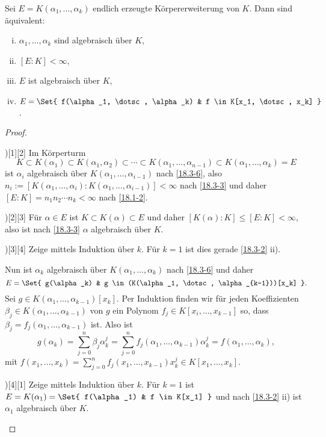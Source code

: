 \begin{kor} \label{18.3-10}
	Sei $E = K(\alpha_1, \dotsc, \alpha_k)$ endlich erzeugte Körpererweiterung von $K$.
	Dann sind äquivalent:
	\begin{enumerate}[i)]
		\item
			$\alpha_1, \dotsc, \alpha_k$ sind algebraisch über $K$,
		\item
			$[E : K] < \infty$,
		\item
			$E$ ist algebraisch über $K$,
		\item
			$E = \Set{ f(\alpha_1, \dotsc, \alpha_k) & f \in K[x_1, \dotsc, x_k] }$.
	\end{enumerate}
	\begin{proof}
		\begin{seg}{\ProofImplication)[1][2]}
			Im Körperturm
			\[
				K \subset K(\alpha_1)
				\subset K(\alpha_1, \alpha_2)
				\subset \dotsb
				\subset K(\alpha_1, \dotsc, \alpha_{n-1})
				\subset K(\alpha_1, \dotsc, \alpha_k)
				= E
			\]
			ist $\alpha_i$ algebraisch über $K(\alpha_1, \dotsc, \alpha_{i-1})$ nach \ref{18.3-6}, also $n_i := [K(\alpha_1, \dotsc, \alpha_i) : K(\alpha_1, \dotsc, \alpha_{i-1})] < \infty$ nach \ref{18.3-3} und daher $[E : K] = n_1 n_2 \dotsb n_k < \infty$ nach \ref{18.1-2}.
		\end{seg}
		\begin{seg}{\ProofImplication)[2][3]}
			Für $\alpha \in E$ ist $K \subset K(\alpha) \subset E$ und daher $[K(\alpha) : K] \le [E : K] < \infty$, also ist nach \ref{18.3-3} $\alpha$ algebraisch über $K$.
		\end{seg}
		\begin{seg}{\ProofImplication)[3][4]}
			Zeige mittels Induktion über $k$.
			Für $k = 1$ ist dies gerade \ref{18.3-2} ii).

			Nun ist $\alpha_k$ algebraisch über $K(\alpha_1, \dotsc, \alpha_k)$ nach \ref{18.3-6} und daher
			\[
				E = \Set{ g(\alpha_k) & g \in (K(\alpha_1, \dotsc, \alpha_{k-1}))[x_k] }.
			\]
			Sei $g \in K(\alpha_1, \dotsc, \alpha_{k-1})[x_k]$.
			Per Induktion finden wir für jeden Koeffizienten $\beta_j \in K(\alpha_1, \dotsc, \alpha_{k-1})$ von $g$ ein Polynom $f_j \in K[x_i, \dotsc, x_{k-1}]$ so, dass $\beta_j = f_j(\alpha_1, \dotsc, \alpha_{k-1})$ ist.
			Also ist
			\[
				g(\alpha_k)
				= \sum_{j=0}^n \beta_j \alpha_k^j
				= \sum_{j=0}^n f_j(\alpha_1, \dotsc, \alpha_{k-1}) \alpha_k^j
				= f(\alpha_1, \dotsc, \alpha_k),
			\]
			mit $f(x_1, \dotsc, x_k) = \sum_{j=0}^n f_j(x_1, \dotsc, x_{k-1}) x_k^j \in K[x_1, \dotsc, x_k]$.
		\end{seg}
		\begin{seg}{\ProofImplication)[4][1]}
			Zeige mittels Induktion über $k$.
			Für $k = 1$ ist $E = K(\alpha_1) = \Set{ f(\alpha_1) & f \in K[x_1] }$ und nach \ref{18.3-2} ii) ist $\alpha_1$ algebraisch über $K$.


\end{seg}
\end{proof}
\end{kor}
